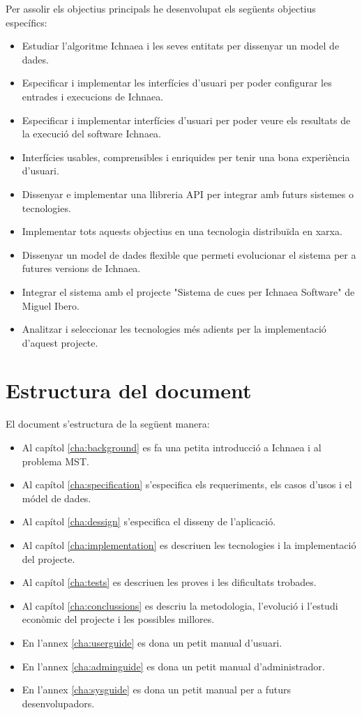 Per assolir els objectius principals he desenvolupat els següents objectius específics:
\begin{itemize}
\item Estudiar l'algoritme Ichnaea i les seves entitats per dissenyar un model de dades.
\item Especificar i implementar les interf\'{i}cies d'usuari per poder configurar les entrades i execucions de Ichnaea.
\item Especificar i implementar interf\'{i}cies d'usuari per poder veure els resultats de la execuci\'{o} del software Ichnaea. 
\item Interf\'{i}cies usables, comprensibles i enriquides per tenir una bona experiència d'usuari. 
\item Dissenyar e implementar una llibreria API per integrar amb futurs sistemes o tecnologies.
\item Implementar tots aquests objectius en una tecnologia distribuïda en xarxa. 
\item Dissenyar un model de dades flexible que permeti evolucionar el sistema per a futures versions de Ichnaea.
\item Integrar el sistema amb el projecte "Sistema de cues per Ichnaea Software" de Miguel Ibero.
\item Analitzar i seleccionar les tecnologies m\'{e}s adients per la implementació d'aquest projecte.
\end{itemize}

\section{Estructura del document}
El document s'estructura de la següent manera:
\begin{itemize}
\item Al cap\'{i}tol \ref{cha:background} es fa una petita introducci\'{o} a Ichnaea i al problema MST. 
\item Al cap\'{i}tol \ref{cha:specification} s'especifica els requeriments, els casos d'usos i el m\'{o}del de dades.
\item Al cap\'{i}tol \ref{cha:dessign} s'especifica el disseny de l'aplicació.
\item Al capítol \ref{cha:implementation} es descriuen les tecnologies i la implementació del projecte.
\item Al capítol \ref{cha:tests} es descriuen les proves i les dificultats trobades.
\item Al cap\'{i}tol \ref{cha:conclussions} es descriu la metodologia, l'evolució i l'estudi econòmic del projecte i les possibles millores.
\item En l'annex \ref{cha:userguide} es dona un petit manual d'usuari.
\item En l'annex \ref{cha:adminguide} es dona un petit manual d'administrador.
\item En l'annex \ref{cha:sysguide} es dona un petit manual per a futurs desenvolupadors.
\end{itemize}

